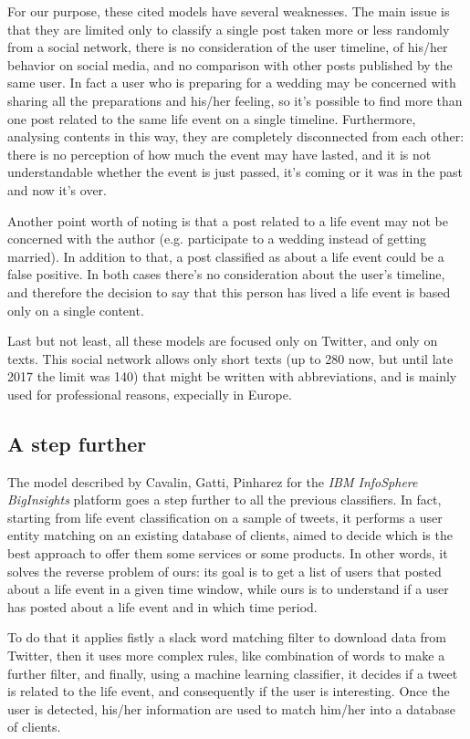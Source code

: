 For our purpose, these cited models have several weaknesses. The main issue is that they are limited only to classify a single post taken more or less randomly from a social network, there is no consideration of the user timeline, of his/her behavior on social media, and no comparison with other posts published by the same user. In fact a user who is preparing for a wedding may be concerned with sharing all the preparations and his/her feeling, so it's possible to find more than one post related to the same life event on a single timeline. Furthermore, analysing contents in this way, they are completely disconnected from each other: there is no perception of how much the event may have lasted, and it is not understandable whether the event is just passed, it's coming or it was in the past and now it's over. 

Another point worth of noting is that a post related to a life event may not be concerned with the author (e.g. participate to a wedding instead of getting married). In addition to that, a post classified as about a life event could be a false positive. In both cases there's no consideration about the user's timeline, and therefore the decision to say that this person has lived a life event is based only on a single content.

Last but not least, all these models are focused only on Twitter, and only on texts. This social network allows only short texts (up to 280 now, but until late 2017 the limit was 140) that might be written with abbreviations, and is mainly used for professional reasons, expecially in Europe.

\subsection{A step further}
The model described by Cavalin, Gatti, Pinharez for the \textit{IBM InfoSphere BigInsights} platform \cite{cavalin2014towards} goes a step further to all the previous classifiers. In fact, starting from life event classification on a sample of tweets, it performs a user entity matching on an existing database of clients, aimed to decide which is the best approach to offer them some services or some products. In other words, it solves the reverse problem of ours: its goal is to get a list of users that posted about a life event in a given time window, while ours is to understand if a user has posted about a life event and in which time period. 

To do that it applies fistly a slack word matching filter to download data from Twitter, then it uses more complex rules, like combination of words to make a further filter, and finally, using a machine learning classifier, it decides if a tweet is related to the life event, and consequently if the user is interesting. Once the user is detected, his/her information are used to match him/her into a database of clients.

